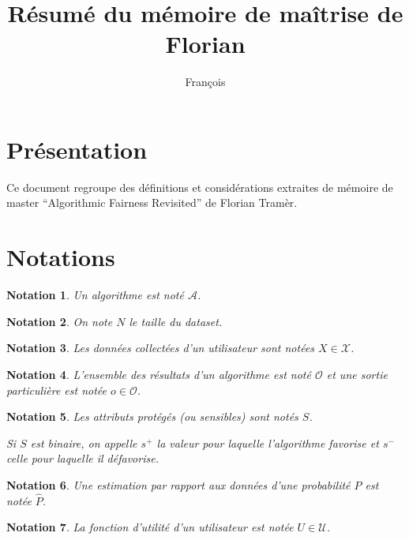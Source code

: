 \documentclass{article}
\title{Résumé du mémoire de maîtrise de Florian \bsc{Tramèr}}
\author{François \bsc{Bidet}}
\newtheorem*{myNot}{Notation}
\theoremstyle{definition}
\begin{document}
\maketitle


\section{Présentation}

Ce document regroupe des définitions et considérations extraites de mémoire de master ``Algorithmic Fairness Revisited'' de Florian Tramèr.


\section{Notations}

\begin{myNot}
  Un algorithme est noté $\mathcal{A}$.
\end{myNot}

\begin{myNot}
  On note $N$ le taille du dataset.
\end{myNot}

\begin{myNot}
  Les données collectées d'un utilisateur sont notées $X \in \mathcal{X}$.
\end{myNot}

\begin{myNot}
  L'ensemble des résultats d'un algorithme est noté $\mathcal{O}$ et une sortie particulière est notée $o \in \mathcal{O}$.
\end{myNot}

\begin{myNot}
  Les attributs protégés (ou sensibles) sont notés $S$.

  Si $S$ est binaire, on appelle $s^{+}$ la valeur pour laquelle l'algorithme favorise et $s^{-}$ celle pour laquelle il défavorise.
\end{myNot}

\begin{myNot}
  Une estimation par rapport aux données d'une probabilité $P$ est notée $\hat{P}$.
\end{myNot}

\begin{myNot}
  La fonction d'utilité d'un utilisateur est notée $U \in \mathcal{U}$.
\end{myNot}
\end{document}

